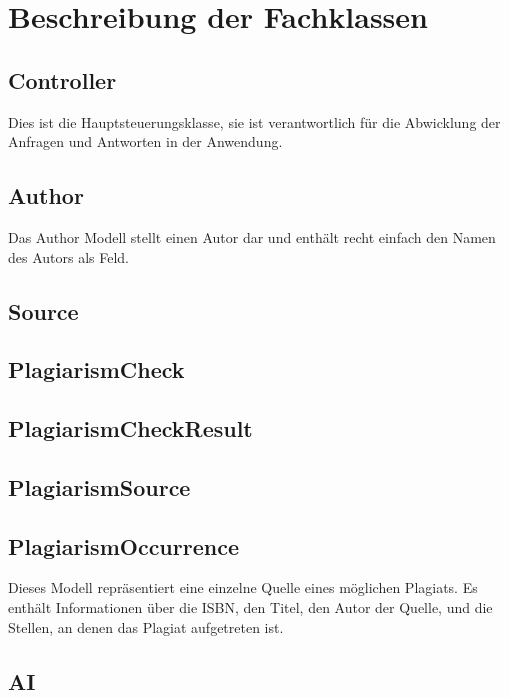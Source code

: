 \section{Beschreibung der Fachklassen}\label{sec:beschreibung_der_fachklassen}

\subsection{Controller}\label{subsec:controller}
Dies ist die Hauptsteuerungsklasse,
sie ist verantwortlich für die Abwicklung der Anfragen und Antworten in der Anwendung.

\subsection{Author}\label{subsec:author}
Das Author Modell stellt einen Autor dar und enthält recht einfach den Namen des Autors als Feld.

\subsection{Source}\label{subsec:source}

\subsection{PlagiarismCheck}\label{subsec:plagiarism_check}

\subsection{PlagiarismCheckResult}\label{subsec:plagiarism_check_result}

\subsection{PlagiarismSource}\label{subsec:plagiarism_source}

\subsection{PlagiarismOccurrence}\label{subsec:plagiarism_occurrence}
Dieses Modell repräsentiert eine einzelne Quelle eines möglichen Plagiats.
Es enthält Informationen über die ISBN, den Titel,
den Autor der Quelle, und die Stellen, an denen das Plagiat aufgetreten ist.

\subsection{AI}\label{subsec:ai}

